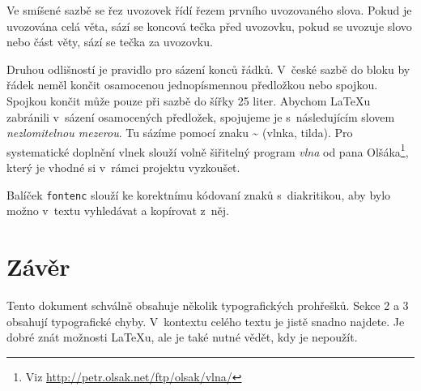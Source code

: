 \documentclass[twocolumn, 10pt]{article}[23.2.2024]
\begin{document}
Ve smíšené sazbě se řez uvozovek řídí řezem prvního uvozovaného slova.
Pokud je uvozována celá věta, sází se koncová tečka před uvozovku, pokud se uvozuje slovo nebo část věty, sází se tečka za uvozovku.\par

Druhou odlišností je pravidlo pro sázení konců řádků.
V~české sazbě do bloku by řádek neměl končit osamocenou jednopísmennou předložkou nebo spojkou.
Spojkou  končit může pouze při sazbě do šířky 25 liter.
Abychom \LaTeX u zabránili v~sázení osamocených předložek, spojujeme je s~následujícím slovem \emph{nezlomitelnou mezerou}.
Tu sázíme pomocí znaku \~{} (vlnka, tilda).
Pro systematické doplnění vlnek slouží volně šiřitelný program \emph{vlna} od pana Olšáka\footnote {{Viz} \href{http://petr.olsak.net/ftp/olsak/vlna/}{http://petr.olsak.net/ftp/olsak/vlna/}}, který je vhodné si v~rámci projektu vyzkoušet.\par

Balíček \texttt{fontenc} slouží ke korektnímu kódovaní znaků s~diakritikou, aby bylo možno v~textu vyhledávat a kopírovat z~něj.\par

\section {Závěr}

Tento dokument schválně obsahuje několik typografických prohřešků.
Sekce 2 a 3 obsahují typografické chyby.
V~kontextu celého textu je jistě snadno najdete.
Je dobré znát možnosti \LaTeX u, ale je také nutné vědět, kdy je nepoužít.\par
\end{document}
